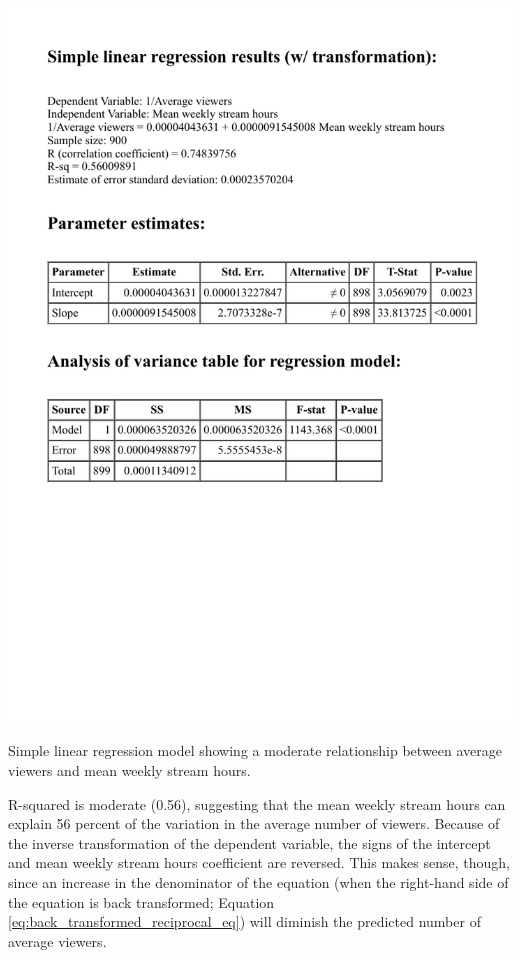 \documentclass[12pt]{article}
\begin{document}

\begin{table}[!ht]
  \centering %
  \includegraphics[scale=0.75]{../StatCrunch_Results/reciprocal/regression_table}
  \captionsetup{justification=raggedright, singlelinecheck=false, margin=2cm}
  \caption[Regression: Average Viewers Predicted by Stream Hours]{Simple linear regression model showing a moderate relationship between average viewers and mean weekly stream hours.}
  \label{table:reciprocal_regression_table}
\end{table}

R-squared is moderate (0.56), suggesting that the mean weekly stream hours can explain 56 percent of the variation in the average number of viewers. Because of the inverse transformation of the dependent variable, the signs of the intercept and mean weekly stream hours coefficient are reversed. This makes sense, though, since an increase in the denominator of the equation (when the right-hand side of the equation is back transformed; Equation \ref{eq:back_transformed_reciprocal_eq}) will diminish the predicted number of average viewers.
\end{document}
